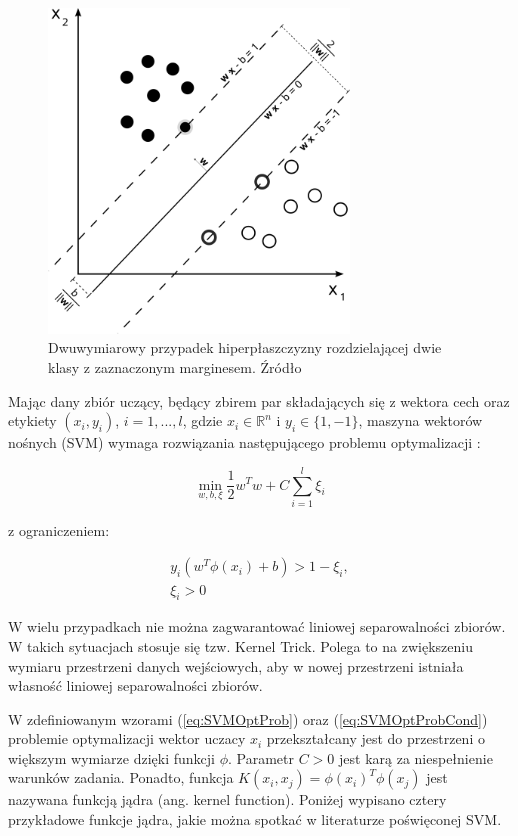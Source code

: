 \begin{figure}[h]
	\centering
	\includegraphics[width=8cm]{Grafika/Svm_max_sep_hyperplane_with_margin}
	\caption{Dwuwymiarowy przypadek hiperpłaszczyzny rozdzielającej dwie klasy z zaznaczonym marginesem. Źródło \cite{SVMWiki}}
	\label{fig:SVM}
\end{figure}

Mając dany zbiór uczący, będący zbirem par składających się z wektora cech oraz etykiety $(x_i, y_i)$, $i = 1,...,l$, gdzie $x_i \in \mathbb{R}^n$ i $y_i \in \{1,-1\}$, maszyna wektorów nośnych (SVM) wymaga rozwiązania następującego problemu optymalizacji \cite{csie}:

\begin{equation}
\label{eq:SVMOptProb}
\min\limits_{w,b,\xi} \frac{1}{2}w^Tw+C\sum_{i=1}^{l}\xi_i
\end{equation}

z ograniczeniem:

\begin{equation}
\label{eq:SVMOptProbCond}
\begin{array}{l}
y_i\left(w^T\phi\left(x_i\right)+b\right) > 1-\xi_i,\\
\xi_i > 0
\end{array}
\end{equation}


W wielu przypadkach nie można zagwarantować liniowej separowalności zbiorów.  W takich sytuacjach stosuje się tzw. Kernel Trick. Polega to na zwiększeniu wymiaru przestrzeni danych wejściowych, aby w nowej przestrzeni istniała własność liniowej separowalności zbiorów.

W zdefiniowanym wzorami (\ref{eq:SVMOptProb}) oraz (\ref{eq:SVMOptProbCond}) problemie optymalizacji wektor uczacy $x_i$ przekształcany jest do przestrzeni o większym wymiarze dzięki funkcji $\phi$. Parametr $C>0$ jest karą za niespełnienie warunków zadania. Ponadto, funkcja $K(x_i,x_j)=\phi(x_i)^T\phi(x_j)$ jest nazywana funkcją jądra (ang. kernel function). Poniżej wypisano cztery przykładowe funkcje jądra, jakie można spotkać w literaturze poświęconej SVM.

